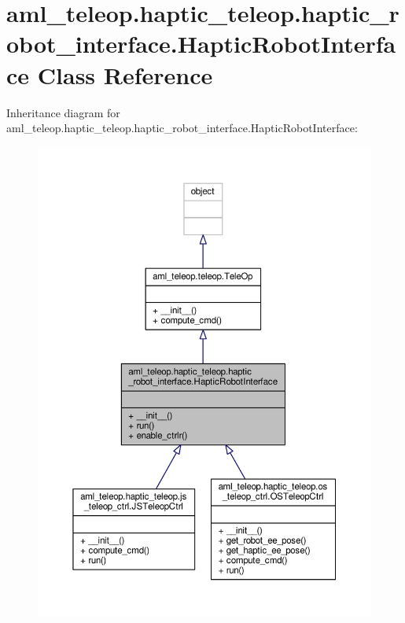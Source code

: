 \hypertarget{classaml__teleop_1_1haptic__teleop_1_1haptic__robot__interface_1_1_haptic_robot_interface}{\section{aml\-\_\-teleop.\-haptic\-\_\-teleop.\-haptic\-\_\-robot\-\_\-interface.\-Haptic\-Robot\-Interface Class Reference}
\label{classaml__teleop_1_1haptic__teleop_1_1haptic__robot__interface_1_1_haptic_robot_interface}
}


Inheritance diagram for aml\-\_\-teleop.\-haptic\-\_\-teleop.\-haptic\-\_\-robot\-\_\-interface.\-Haptic\-Robot\-Interface\-:
\nopagebreak
\begin{figure}[H]
\begin{center}
\leavevmode
\includegraphics[width=350pt]{classaml__teleop_1_1haptic__teleop_1_1haptic__robot__interface_1_1_haptic_robot_interface__inherit__graph}
\end{center}
\end{figure}


